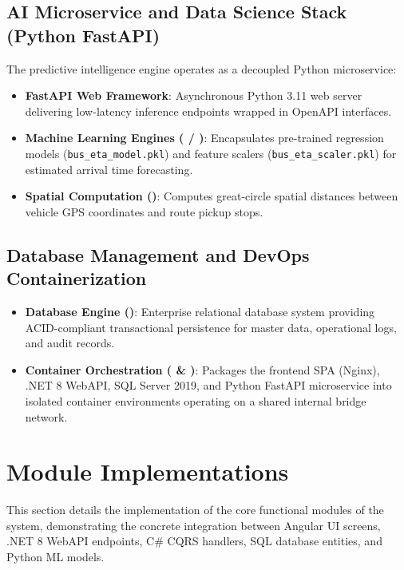 \subsection{AI Microservice and Data Science Stack (Python FastAPI)}
The predictive intelligence engine operates as a decoupled Python microservice:
\begin{itemize}
  \item \textbf{FastAPI Web Framework}: Asynchronous Python 3.11 web server delivering low-latency inference endpoints wrapped in OpenAPI interfaces.
  \item \textbf{Machine Learning Engines ( / )}: Encapsulates pre-trained regression models (\texttt{bus\_eta\_model.pkl}) and feature scalers (\texttt{bus\_eta\_scaler.pkl}) for estimated arrival time forecasting.
  \item \textbf{Spatial Computation ()}: Computes great-circle spatial distances between vehicle GPS coordinates and route pickup stops.
\end{itemize}

\subsection{Database Management and DevOps Containerization}
\begin{itemize}
  \item \textbf{Database Engine ()}: Enterprise relational database system providing ACID-compliant transactional persistence for master data, operational logs, and audit records.
  \item \textbf{Container Orchestration ( \& )}: Packages the frontend SPA (Nginx), .NET 8 WebAPI, SQL Server 2019, and Python FastAPI microservice into isolated container environments operating on a shared internal bridge network.
\end{itemize}

\section{Module Implementations}
\label{sec:impl_module_implementations}

This section details the implementation of the core functional modules of the system, demonstrating the concrete integration between Angular UI screens, .NET 8 WebAPI endpoints, C\# CQRS handlers, SQL database entities, and Python ML models.

